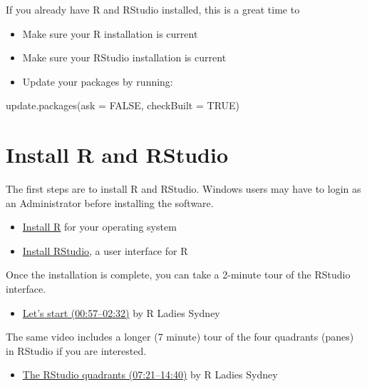 \documentclass[
]{book}
\newenvironment{Shaded}{\begin{snugshade}}{\end{snugshade}}
\newcommand{\AttributeTok}[1]{\textcolor[rgb]{0.77,0.63,0.00}{#1}}
\newcommand{\ConstantTok}[1]{\textcolor[rgb]{0.00,0.00,0.00}{#1}}
\newcommand{\FunctionTok}[1]{\textcolor[rgb]{0.00,0.00,0.00}{#1}}
\newcommand{\NormalTok}[1]{#1}
\providecommand{\tightlist}{%
  \setlength{\itemsep}{0pt}\setlength{\parskip}{0pt}}
\begin{document}
If you already have R and RStudio installed, this is a great time to

\begin{itemize}
\tightlist
\item
  Make sure your R installation is current
\item
  Make sure your RStudio installation is current
\item
  Update your packages by running:
\end{itemize}

\begin{Shaded}
\begin{Highlighting}[]
\FunctionTok{update.packages}\NormalTok{(}\AttributeTok{ask =} \ConstantTok{FALSE}\NormalTok{, }\AttributeTok{checkBuilt =} \ConstantTok{TRUE}\NormalTok{)}
\end{Highlighting}
\end{Shaded}

\hypertarget{install-r-and-rstudio}{%
\section{Install R and RStudio}\label{install-r-and-rstudio}}

The first steps are to install R and RStudio. Windows users may have to login as an Administrator before installing the software.

\begin{itemize}
\tightlist
\item
  \href{https://cloud.r-project.org}{Install R} for your operating system\\
\item
  \href{https://www.rstudio.com/products/rstudio/\#Desktop}{Install RStudio}, a user interface for R
\end{itemize}

Once the installation is complete, you can take a 2-minute tour of the RStudio interface.

\begin{itemize}
\tightlist
\item
  \href{https://www.youtube.com/embed/kfcX5DEMAp4?start=57\&end=152}{Let's start (00:57--02:32)} by R Ladies Sydney \citep{RLadiesSydney:2018:Lesson1}
\end{itemize}

The same video includes a longer (7 minute) tour of the four quadrants (panes) in RStudio if you are interested.

\begin{itemize}
\tightlist
\item
  \href{https://www.youtube.com/embed/kfcX5DEMAp4?start=441\&end=880}{The RStudio quadrants (07:21--14:40)} by R Ladies Sydney \citep{RLadiesSydney:2018:Lesson1}
\end{itemize}
\end{document}
